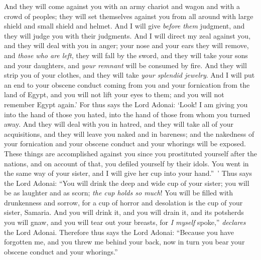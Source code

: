 \begin{biblechapter}
\verse And they will come against you with an army chariot and wagon and with a crowd of peoples; they will set themselves against you from all around with large shield and small shield and helmet. And I will give \textit{before them} judgment, and they will judge you with their judgments.
\verse And I will direct my zeal against you, and they will deal with you in anger; your nose and your ears they will remove, and \textit{those who are left}, they will fall by the sword, and they will take your sons and your daughters, and \textit{your remnant} will be consumed by fire.
\verse And they will strip you of your clothes, and they will take \textit{your splendid jewelry}.
\verse And I will put an end to your obscene conduct coming from you and your fornication from the land of Egypt, and you will not lift your eyes to them; and you will not remember Egypt again.’
\verse For thus says the Lord Adonai: ‘Look! I am giving you into the hand of those you hated, into the hand of those from whom you turned away.
\verse And they will deal with you in hatred, and they will take all of your acquisitions, and they will leave you naked and in bareness; and the nakedness of your fornication and your obscene conduct and your whorings will be exposed.
\verse These things are accomplished against you since you prostituted yourself after the nations, and on account of that, you defiled yourself by their idols.
\verse You went in the same way of your sister, and I will give her cup into your hand.” ’
\verse Thus says the Lord Adonai: “You will drink the deep and wide cup of your sister; you will be as laughter and as scorn; \textit{the cup holds so much}!
\verse You will be filled with drunkenness and sorrow, for a cup of horror and desolation is the cup of your sister, Samaria.
\verse And you will drink it, and you will drain it, and its potsherds you will gnaw, and you will tear out your breasts, for \textit{I myself} spoke,” \textit{declares} the Lord Adonai.
\verse Therefore thus says the Lord Adonai: “Because you have forgotten me, and you threw me behind your back, now in turn you bear your obscene conduct and your whorings.”

\end{biblechapter}
